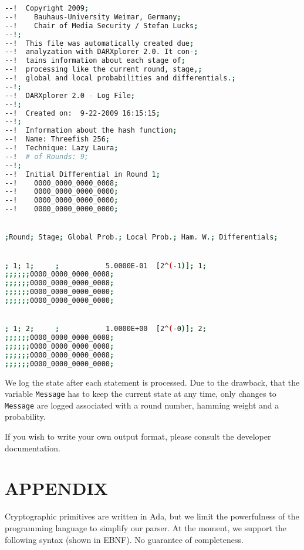 \documentclass{acmtrans2m}
\begin{document}
\begin{lstlisting}[language=bash,caption={Excerpt from the log file for Threefish 256 in CSV file
format, analyzed by Lazy Laura. For each stage, i.e. for each executed statement, is printed
the current differential and the corresponding probability.},label=listing:logfile]
--!  Copyright 2009;
--!    Bauhaus-University Weimar, Germany;
--!    Chair of Media Security / Stefan Lucks;
--!;
--!  This file was automatically created due;
--!  analyzation with DARXplorer 2.0. It con-;
--!  tains information about each stage of;
--!  processing like the current round, stage,;
--!  global and local probabilities and differentials.;
--!;
--!  DARXplorer 2.0 - Log File;
--!;
--!  Created on:  9-22-2009 16:15:15;
--!;
--!  Information about the hash function;
--!  Name: Threefish 256;
--!  Technique: Lazy Laura;
--!  # of Rounds: 9;
--!;
--!  Initial Differential in Round 1;
--!    0000_0000_0000_0008;
--!    0000_0000_0000_0000;
--!    0000_0000_0000_0000;
--!    0000_0000_0000_0000;


;Round; Stage; Global Prob.; Local Prob.; Ham. W.; Differentials;


; 1; 1;     ;           5.0000E-01  [2^(-1)]; 1; 
;;;;;;0000_0000_0000_0008; 
;;;;;;0000_0000_0000_0008; 
;;;;;;0000_0000_0000_0000; 
;;;;;;0000_0000_0000_0000; 


; 1; 2;     ;           1.0000E+00  [2^(-0)]; 2; 
;;;;;;0000_0000_0000_0008; 
;;;;;;0000_0000_0000_0008; 
;;;;;;0000_0000_0000_0008; 
;;;;;;0000_0000_0000_0000; 
\end{lstlisting}

We log the state after each statement is processed. Due to the drawback, that
the variable \texttt{Message} has to keep the current state at any time, only 
changes to \texttt{Message} are logged associated with a round number, hamming
weight and a probability.

\bigbreak

If you wish to write your own output format, please consult the developer documentation.

\vfill



\clearpage

\section*{APPENDIX}
\setcounter{section}{1}

\medskip
Cryptographic primitives are written in Ada, but we limit the powerfulness of
the programming language to simplify our parser. At the moment,
we support the following syntax (shown in EBNF). No guarantee of completeness.
\end{document}
